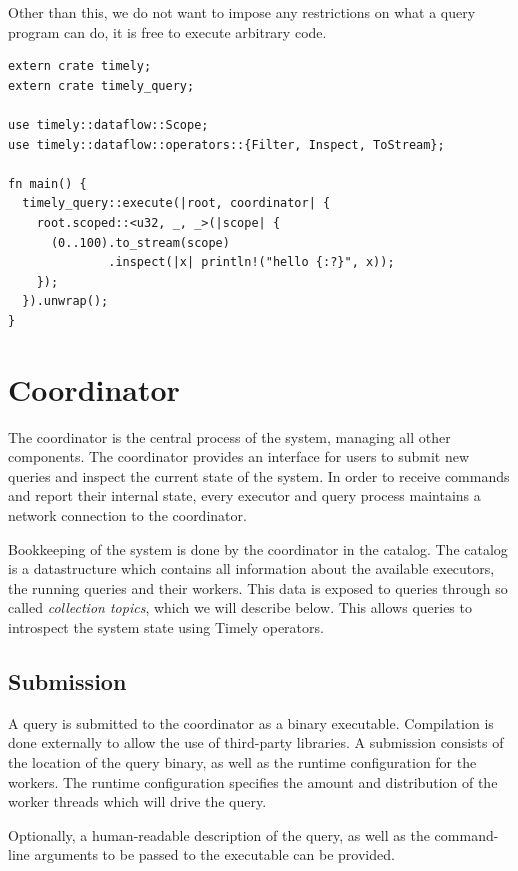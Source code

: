 Other than this, we do not want to impose any restrictions on what a query program
can do, it is free to execute arbitrary code.

\begin{lstlisting}[caption={[Example query.]Example query which prints out a stream of integers.}]
extern crate timely;
extern crate timely_query;

use timely::dataflow::Scope;
use timely::dataflow::operators::{Filter, Inspect, ToStream};

fn main() {
  timely_query::execute(|root, coordinator| {
    root.scoped::<u32, _, _>(|scope| {
      (0..100).to_stream(scope)
              .inspect(|x| println!("hello {:?}", x));
    });
  }).unwrap();
}
\end{lstlisting}

\section{Coordinator}

The coordinator is the central process of the system, managing all other
components. 
The coordinator provides an interface for users to submit new queries and
inspect the current state of the system. In order to receive commands and
report their internal state, every executor and query process maintains a
network connection to the coordinator.

Bookkeeping of the system is done by the coordinator in the catalog. The
catalog is a datastructure which contains all information about the available
executors, the running queries and their workers. This data is exposed to
queries through so called \emph{collection topics}, which we will describe
below. This allows queries to introspect the system state using Timely operators.

\subsection{Submission}

A query is submitted to the coordinator as a binary executable. Compilation
is done externally to allow the use of third-party libraries. A submission
consists of the location of the query binary, as well as the runtime
configuration for the workers. The runtime configuration specifies the amount
and distribution of the worker threads which will drive the query.

Optionally, a human-readable description of the query,
as well as the command-line arguments to be passed to the executable can be
provided.

